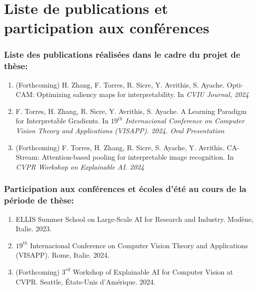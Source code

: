 \newpage
\chapter*{Liste de publications et participation aux conférences}
\subsection*{Liste des publications réalisées dans le cadre du projet de thèse:}
\begin{enumerate}
    \item (Forthcoming) H. Zhang, F. Torres, R. Sicre, Y. Avrithis, S. Ayache. Opti-CAM: 
    Optimizing saliency maps for interpretability. In \emph{CVIU Journal, 2024}
    \item F. Torres, H. Zhang, R. Sicre, Y. Avrithis, S. Ayache. A Learning Paradigm for 
    Interpretable Gradients. In \emph{$19^{th}$ Internacional Conference on Computer Vision 
    Theory and Applications (VISAPP). 2024. Oral Presentation}
    \item (Forthcoming) F. Torres, H. Zhang, R. Sicre, S. Ayache, Y. Avrithis. CA-Stream: 
    Attention-based pooling for interpretable image recognition. In \emph{CVPR Workshop 
    on Explainable AI. 2024}
\end{enumerate}


\subsection*{Participation aux conférences et écoles d’été au cours de la période de thèse:}
\begin{enumerate}
\item ELLIS Summer School on Large-Scale AI for Research and Industry. Modène, Italie. 2023.
\item $19^{th}$ Internacional Conference on Computer Vision Theory and Applications (VISAPP). Rome, Italie. 2024.
\item (Forthcoming) $3^{rd}$ Workshop of Explainable AI for Computer Vision at CVPR. Seattle, États-Unis d'Amérique. 2024.
\end{enumerate}
